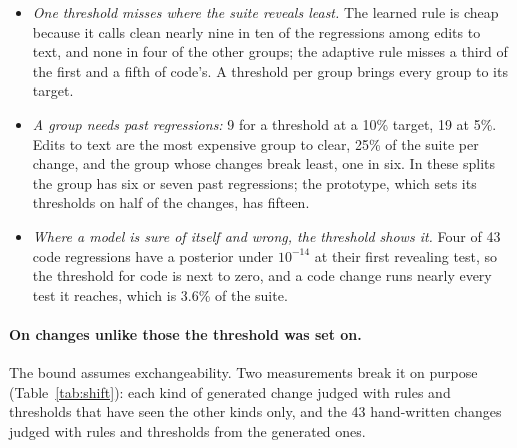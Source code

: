\documentclass[11pt,a4paper]{article}
\begin{document}
\begin{itemize}
  \item \emph{One threshold misses where the suite reveals least.} The learned rule is cheap because it calls clean
        nearly nine in ten of the regressions among edits to text, and none in four of the other groups; the
        adaptive rule misses a third of the first and a fifth of code's. A threshold per group brings every group
        to its target.
  \item \emph{A group needs past regressions:} 9 for a threshold at a 10\% target, 19 at 5\%. Edits to text are the
        most expensive group to clear, 25\% of the suite per change, and the group whose changes break least, one
        in six. In these splits the group has six or seven past regressions; the prototype, which sets its
        thresholds on half of the changes, has fifteen.
  \item \emph{Where a model is sure of itself and wrong, the threshold shows it.} Four of 43 code regressions
        have a posterior under $10^{-14}$ at their first revealing test, so the threshold for code is next to
        zero, and a code change runs nearly every test it reaches, which is 3.6\% of the suite.
\end{itemize}

\paragraph{On changes unlike those the threshold was set on.} The bound assumes exchangeability. Two measurements
break it on purpose (Table~\ref{tab:shift}): each kind of generated change judged with rules and thresholds that
have seen the other kinds only, and the 43 hand-written changes judged with rules and thresholds from the
generated ones.
\end{document}
